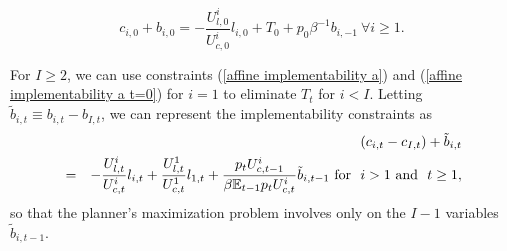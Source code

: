 \documentclass[thmsb,11pt]{article}
\begin{document}
\begin{equation}
\label{affine implementability a t=0}
c_{i,0}+b_{i,0}=-\frac{U_{l,0}^{i}}{U_{c,0}^{i}}l_{i,0}+T_{0}+
p_0 \beta^{-1}b_{i,-1}\ \forall i \geq 1.
\end{equation}

\noindent For $I\geq 2$, we can use constraints (\ref{affine implementability
a}) and (\ref{affine implementability
a t=0}) for  $i=1$ to eliminate $T_{t}$ for $i < I$. Letting $\tilde{b}%
_{i,t}\equiv b_{i,t}-b_{I,t}$, we can represent the implementability constraints
as
\begin{eqnarray}
\label{affine implementability b}
&&\left( c_{i,t}-c_{I,t}\right) +\tilde{b}_{i,t}\\
&=&-\frac{U_{l,t}^{i}}{U_{c,t}^{i}}l_{i,t}+\frac{U^1_{l,t}}{U^1_{c,t}}l_{1,t} +\frac{p_tU_{c,t-1}^{i}}{\beta \mathbb{E}%
_{t-1}p_tU_{c,t}^{i}}\tilde{b}_{i,t-1}\ \text{\rm for \ }i>1 \ \text{\rm and \ } t\geq 1,  \notag
\end{eqnarray}
so that  the planner's
maximization problem involves only on the $I-1$ variables $\tilde{b}_{i,t-1}.$
\end{document}
